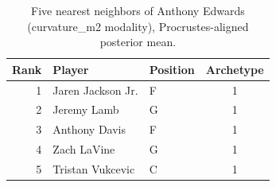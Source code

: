 \begin{table}[htbp]
  \centering\small
  \begin{tabular}{rllc}
    \toprule
    Rank & Player & Position & Archetype \\
    \midrule
    1 & Jaren Jackson Jr. & F & 1 \\
    2 & Jeremy Lamb & G & 1 \\
    3 & Anthony Davis & F & 1 \\
    4 & Zach LaVine & G & 1 \\
    5 & Tristan Vukcevic & C & 1 \\
    \bottomrule
  \end{tabular}
  \caption{Five nearest neighbors of Anthony Edwards (curvature_m2 modality), Procrustes-aligned posterior mean.}
  \label{tab:Anthony_Edwards_neighbors_curvature_m2}
\end{table}

